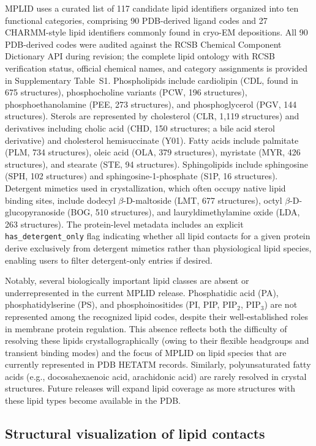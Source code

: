 \documentclass[unnumsec,webpdf,contemporary,large]{oup-authoring-template}
\begin{document}
MPLID uses a curated list of 117 candidate lipid identifiers organized into ten functional categories, comprising 90 PDB-derived ligand codes and 27 CHARMM-style lipid identifiers commonly found in cryo-EM depositions. All 90 PDB-derived codes were audited against the RCSB Chemical Component Dictionary API during revision; the complete lipid ontology with RCSB verification status, official chemical names, and category assignments is provided in Supplementary Table~S1. Phospholipids include cardiolipin (CDL, found in 675 structures), phosphocholine variants (PCW, 196 structures), phosphoethanolamine (PEE, 273 structures), and phosphoglycerol (PGV, 144 structures). Sterols are represented by cholesterol (CLR, 1,119 structures) and derivatives including cholic acid (CHD, 150 structures; a bile acid sterol derivative) and cholesterol hemisuccinate (Y01). Fatty acids include palmitate (PLM, 734 structures), oleic acid (OLA, 379 structures), myristate (MYR, 426 structures), and stearate (STE, 94 structures). Sphingolipids include sphingosine (SPH, 102 structures) and sphingosine-1-phosphate (S1P, 16 structures). Detergent mimetics used in crystallization, which often occupy native lipid binding sites, include dodecyl $\beta$-D-maltoside (LMT, 677 structures), octyl $\beta$-D-glucopyranoside (BOG, 510 structures), and lauryldimethylamine oxide (LDA, 263 structures). The protein-level metadata includes an explicit \texttt{has\_detergent\_only} flag indicating whether all lipid contacts for a given protein derive exclusively from detergent mimetics rather than physiological lipid species, enabling users to filter detergent-only entries if desired.

Notably, several biologically important lipid classes are absent or underrepresented in the current MPLID release. Phosphatidic acid (PA), phosphatidylserine (PS), and phosphoinositides (PI, PIP, PIP$_2$, PIP$_3$) are not represented among the recognized lipid codes, despite their well-established roles in membrane protein regulation. This absence reflects both the difficulty of resolving these lipids crystallographically (owing to their flexible headgroups and transient binding modes) and the focus of MPLID on lipid species that are currently represented in PDB HETATM records. Similarly, polyunsaturated fatty acids (e.g., docosahexaenoic acid, arachidonic acid) are rarely resolved in crystal structures. Future releases will expand lipid coverage as more structures with these lipid types become available in the PDB.

\subsection{Structural visualization of lipid contacts}
\end{document}
